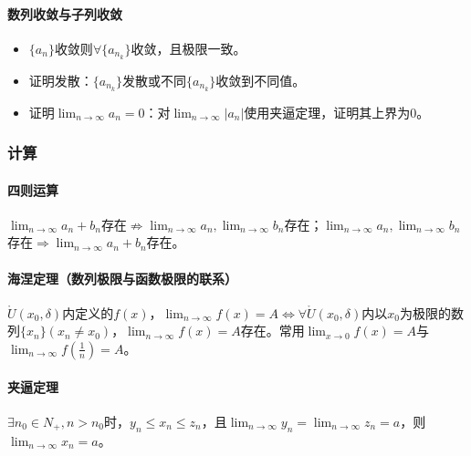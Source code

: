 \documentclass[
12pt, %
a4paper, 
oneside, %
headinclude,footinclude, %
]{scrartcl}
\begin{document}
\paragraph{数列收敛与子列收敛}
\begin{itemize}
\item $ \{a_n\} $收敛则$ \forall \{a_{n_k}\} $收敛，且极限一致。
\item 证明发散：$ \{a_{n_k}\} $发散或不同$ \{a_{n_k}\} $收敛到不同值。
\item 证明$ \lim_{n \to \infty} a_n = 0 $：对$ \lim_{n \to \infty} |a_n| $使用夹逼定理，证明其上界为$ 0 $。
\end{itemize}
\subsubsection[计算]{计算}
\paragraph{四则运算}
$ \lim_{n \to \infty} a_n + b_n $存在$ \nRightarrow $$ \lim_{n \to \infty} a_n, \lim_{n \to \infty} b_n $存在；$ \lim_{n \to \infty} a_n, \lim_{n \to \infty} b_n $存在$ \Rightarrow $$ \lim_{n \to \infty} a_n + b_n $存在。
\paragraph{海涅定理（数列极限与函数极限的联系）}
$ \mathring{U}(x_0, \delta) $内定义的$ f(x) $，$ \lim_{n \to \infty} f(x) = A $$ \Leftrightarrow $$ \forall \mathring{U}(x_0, \delta) $内以$ x_0 $为极限的数列$ \{x_n\}(x_n \neq x_0) $，$ \lim_{n \to \infty} f(x) = A $存在。常用$ \lim_{x \to 0} f(x) = A $与$ \lim_{n \to \infty} f(\frac{1}{n}) = A $。
\paragraph{夹逼定理}
$ \exists n_0 \in N_+, n > n_0 $时，$ y_n \leq x_n \leq z_n $，且$ \lim_{n \to \infty} y_n = \lim_{n \to \infty} z_n = a $，则$ \lim_{n \to \infty} x_n = a $。
\end{document}
